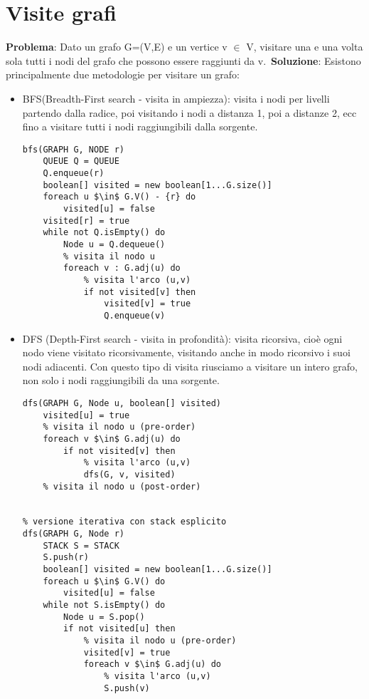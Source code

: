 \documentclass[../cheatSheetAlgoritmi.tex]{subfiles}
\begin{document}
\section{Visite grafi}
\textbf{Problema}: Dato un grafo G=(V,E) e un vertice v $\in$ V,
visitare una e una volta sola tutti i nodi del grafo che possono essere raggiunti da v.\
\textbf{Soluzione}: Esistono principalmente due metodologie per visitare un grafo:\
\begin{itemize}
\item BFS(Breadth-First search - visita in ampiezza): visita i nodi per livelli partendo dalla radice, poi visitando i nodi a distanza 1, poi a distanze 2, ecc fino a visitare tutti i nodi raggiungibili dalla sorgente.

\begin{adjustbox}{max width=\linewidth}
\begin{lstlisting}[caption= Visita BFS]
bfs(GRAPH G, NODE r)
	QUEUE Q = QUEUE
	Q.enqueue(r)
	boolean[] visited = new boolean[1...G.size()]
	foreach u $\in$ G.V() - {r} do
		visited[u] = false
	visited[r] = true
	while not Q.isEmpty() do
		Node u = Q.dequeue()
		% visita il nodo u
		foreach v : G.adj(u) do
			% visita l'arco (u,v)
			if not visited[v] then
				visited[v] = true
				Q.enqueue(v)
\end{lstlisting}
\end{adjustbox}
	\item DFS (Depth-First search - visita in profondità): visita ricorsiva, cioè ogni nodo viene visitato ricorsivamente, visitando anche in modo ricorsivo i suoi nodi adiacenti. Con questo tipo di visita riusciamo a visitare un intero grafo, non solo i nodi raggiungibili da una sorgente.
\begin{adjustbox}{max width=\linewidth}
\begin{lstlisting}[caption= Visita DFS]
% versione ricorsiva con stack implicito
dfs(GRAPH G, Node u, boolean[] visited)
	visited[u] = true
	% visita il nodo u (pre-order)
	foreach v $\in$ G.adj(u) do
		if not visited[v] then
			% visita l'arco (u,v)
			dfs(G, v, visited)
	% visita il nodo u (post-order)


% versione iterativa con stack esplicito
dfs(GRAPH G, Node r)
	STACK S = STACK
	S.push(r)
	boolean[] visited = new boolean[1...G.size()]
	foreach u $\in$ G.V() do
		visited[u] = false
	while not S.isEmpty() do
		Node u = S.pop()
		if not visited[u] then
			% visita il nodo u (pre-order)
			visited[v] = true
			foreach v $\in$ G.adj(u) do
				% visita l'arco (u,v)
				S.push(v)
\end{lstlisting}
\end{adjustbox}
\end{itemize}
 
\end{document}
